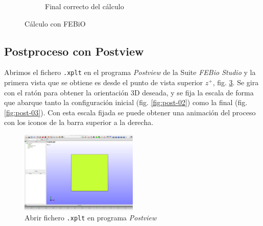\begin{figure}[!htp]
\begin{subfigure}[b]{0.48\textwidth}
\caption{Final correcto del cálculo}
\label{fig:feb-02}
\end{subfigure}
\caption{Cálculo con FEBiO}
\label{fig:feb-01-02}
\end{figure}

\subsection{Postproceso con Postview}

Abrimos el fichero \texttt{.xplt} en el programa \emph{Postview} de la Suite \emph{FEBio Studio} y la primera vista que se obtiene es desde el punto de vista superior $z^{+}$, fig. \ref{fig:post-01}.
Se gira con el ratón para obtener la orientación 3D deseada, y se fija la escala de forma que abarque tanto la configuración inicial (fig. \ref{fig:post-02}) como la final (fig. \ref{fig:post-03}).
Con esta escala fijada se puede obtener una animación del proceso con los iconos de la barra superior a la derecha.
\begin{figure}[!htp]
\centering
\includegraphics[width=0.5\textwidth]{figuras_3/scr-post-01.png}
\caption{Abrir fichero \texttt{.xplt} en programa \emph{Postview}}
\label{fig:post-01}
\end{figure}

